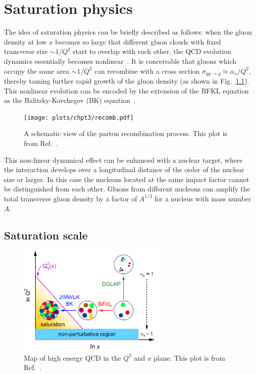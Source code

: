 \chapter{Saturation physics}
\label{chp:saturation}

The idea of saturation physics can be briefly described as follows: when the
gluon density at low $x$ becomes so large that different gluon clouds with fixed
transverse size $\sim 1/Q^{2}$ start to overlap with each other, the QCD
evolution dynamics essentially becomes nonlinear~\cite{Gribov:1984tu,Mueller:1985wy}. 
It is conceivable that gluons which occupy the same area $\sim 1/Q^{2}$ can recombine with a cross section $\sigma_{gg\rightarrow g}\simeq \alpha_{s}/Q^{2}$, thereby taming further
rapid growth of the gluon density (as shown in Fig.~\ref{fig:recombine}). This nonlinear evolution can be encoded by the extension of the BFKL
equation as the Balitsky-Kovchegov (BK) equation~\cite{Balitsky:1995ub}.
\begin{figure}
\centering
\texttt{[image: plots/chpt3/recomb.pdf]}
\caption[A schematic view of parton recombination process]{
A schematic view of the parton recombination process. This plot is from Ref.~\cite{Accardi:2012qut}.}
\label{fig:recombine}
\end{figure}

This non-linear dynamical effect can be enhanced with a nuclear target, where the
interaction develops over a longitudinal distance of the order of the nuclear size
or larger. 
In this case the nucleons located at the same impact factor
cannot be distinguished from each other. Gluons from different nucleons can
amplify the total transverse gluon density by a factor of $A^{1/3}$ for a
nucleus with mass number $A$. 

\section{Saturation scale}

\begin{figure}
\centering
\includegraphics[width=0.65\textwidth]{plots/chpt3/Q2Vx_map.png}
\caption[Evolution approaches in $Q^{2}$ vs $x$ plane]{
Map of high energy QCD in the $Q^{2}$ and $x$ plane. This plot is from Ref.~\cite{Accardi:2012qut}.}
\label{fig:Q2vX_map}
\end{figure}

